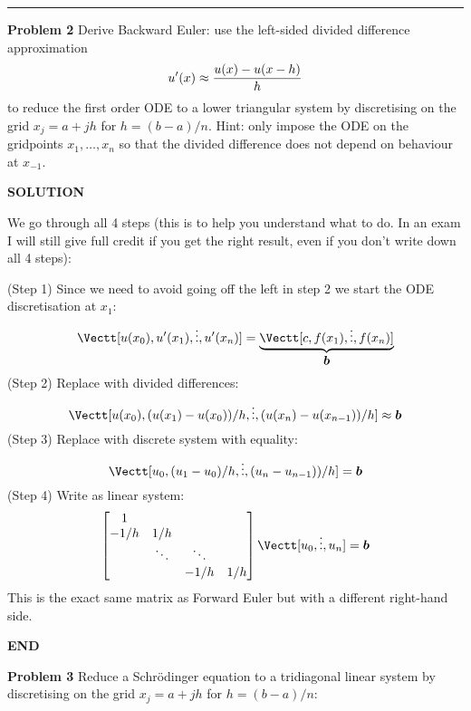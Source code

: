 \documentclass[12pt,a4paper]{article}
\def\b{ {\vc b} }
\begin{document}
\rule{\textwidth}{1pt}
\textbf{Problem 2} Derive  Backward Euler: use the left-sided divided difference approximation
\[
u'(x) \ensuremath{\approx} {u(x) - u(x-h)  \over h}
\]
to reduce the first order ODE
to a lower triangular system by discretising on the grid $x_j = a + j h$ for $h = (b-a)/n$. Hint: only impose the ODE on the gridpoints $x_1,\ensuremath{\ldots},x_n$ so that the divided difference does not depend on behaviour at $x_{-1}$.

\textbf{SOLUTION}

We go through all 4 steps (this is to help you understand what to do. In an exam I will still give full credit if you get the right result, even if you don't write down all 4 steps):

(Step 1) Since we need to avoid going off the left in step 2 we start the ODE discretisation at $x_1$:
\[
\Vectt[u(x_0), u'(x_1), \ensuremath{\vdots}, u'(x_n)] = \underbrace{\Vectt[c, f(x_1),\ensuremath{\vdots},f(x_n)]}_{\ensuremath{\bm{\b}}}
\]
(Step 2) Replace with divided differences:
\[
\Vectt[u(x_0), (u(x_1)-u(x_0))/h, \ensuremath{\vdots}, (u(x_n)-u(x_{n-1}))/h] \ensuremath{\approx} \ensuremath{\bm{\b}}
\]
(Step 3) Replace with discrete system with equality:
\[
\Vectt[u_0, (u_1-u_0)/h, \ensuremath{\vdots}, (u_n-u_{n-1}))/h] = \ensuremath{\bm{\b}}
\]
(Step 4) Write as linear system:
\[
\begin{bmatrix}
1 \\
-1/h & 1/h \\
& \ensuremath{\ddots} & \ensuremath{\ddots} \\
&& -1/h & 1/h 
\end{bmatrix} \Vectt[u_0,\ensuremath{\vdots},u_n] = \ensuremath{\bm{\b}}
\]
This is the exact same matrix as Forward Euler but with a different right-hand side.

\textbf{END}

\textbf{Problem 3} Reduce a Schrödinger equation to a tridiagonal linear system by discretising on the grid $x_j = a + j h$ for $h = (b-a)/n$:
\end{document}
